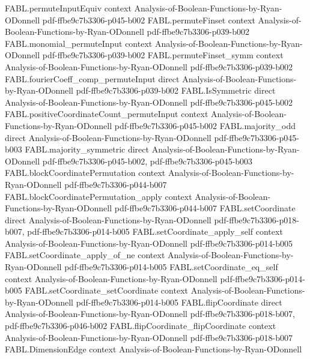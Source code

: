 \begin{theorem}
\proofstep
  {FABL.permuteInputEquiv}
  {context}
  {Analysis-of-Boolean-Functions-by-Ryan-ODonnell}
  {pdf-ffbe9c7b3306-p045-b002}
\proofstep
  {FABL.permuteFinset}
  {context}
  {Analysis-of-Boolean-Functions-by-Ryan-ODonnell}
  {pdf-ffbe9c7b3306-p039-b002}
\proofstep
  {FABL.monomial_permuteInput}
  {context}
  {Analysis-of-Boolean-Functions-by-Ryan-ODonnell}
  {pdf-ffbe9c7b3306-p039-b002}
\proofstep
  {FABL.permuteFinset_symm}
  {context}
  {Analysis-of-Boolean-Functions-by-Ryan-ODonnell}
  {pdf-ffbe9c7b3306-p039-b002}
\proofstep
  {FABL.fourierCoeff_comp_permuteInput}
  {direct}
  {Analysis-of-Boolean-Functions-by-Ryan-ODonnell}
  {pdf-ffbe9c7b3306-p039-b002}
\proofstep
  {FABL.IsSymmetric}
  {direct}
  {Analysis-of-Boolean-Functions-by-Ryan-ODonnell}
  {pdf-ffbe9c7b3306-p045-b002}
\proofstep
  {FABL.positiveCoordinateCount_permuteInput}
  {context}
  {Analysis-of-Boolean-Functions-by-Ryan-ODonnell}
  {pdf-ffbe9c7b3306-p045-b002}
\proofstep
  {FABL.majority_odd}
  {direct}
  {Analysis-of-Boolean-Functions-by-Ryan-ODonnell}
  {pdf-ffbe9c7b3306-p045-b003}
\proofstep
  {FABL.majority_symmetric}
  {direct}
  {Analysis-of-Boolean-Functions-by-Ryan-ODonnell}
  {pdf-ffbe9c7b3306-p045-b002,
    pdf-ffbe9c7b3306-p045-b003}
\proofstep
  {FABL.blockCoordinatePermutation}
  {context}
  {Analysis-of-Boolean-Functions-by-Ryan-ODonnell}
  {pdf-ffbe9c7b3306-p044-b007}
\proofstep
  {FABL.blockCoordinatePermutation_apply}
  {context}
  {Analysis-of-Boolean-Functions-by-Ryan-ODonnell}
  {pdf-ffbe9c7b3306-p044-b007}
\proofstep
  {FABL.setCoordinate}
  {direct}
  {Analysis-of-Boolean-Functions-by-Ryan-ODonnell}
  {pdf-ffbe9c7b3306-p018-b007,
    pdf-ffbe9c7b3306-p014-b005}
\proofstep
  {FABL.setCoordinate_apply_self}
  {context}
  {Analysis-of-Boolean-Functions-by-Ryan-ODonnell}
  {pdf-ffbe9c7b3306-p014-b005}
\proofstep
  {FABL.setCoordinate_apply_of_ne}
  {context}
  {Analysis-of-Boolean-Functions-by-Ryan-ODonnell}
  {pdf-ffbe9c7b3306-p014-b005}
\proofstep
  {FABL.setCoordinate_eq_self}
  {context}
  {Analysis-of-Boolean-Functions-by-Ryan-ODonnell}
  {pdf-ffbe9c7b3306-p014-b005}
\proofstep
  {FABL.setCoordinate_setCoordinate}
  {context}
  {Analysis-of-Boolean-Functions-by-Ryan-ODonnell}
  {pdf-ffbe9c7b3306-p014-b005}
\proofstep
  {FABL.flipCoordinate}
  {direct}
  {Analysis-of-Boolean-Functions-by-Ryan-ODonnell}
  {pdf-ffbe9c7b3306-p018-b007,
    pdf-ffbe9c7b3306-p046-b002}
\proofstep
  {FABL.flipCoordinate_flipCoordinate}
  {context}
  {Analysis-of-Boolean-Functions-by-Ryan-ODonnell}
  {pdf-ffbe9c7b3306-p018-b007}
\proofstep
  {FABL.DimensionEdge}
  {context}
  {Analysis-of-Boolean-Functions-by-Ryan-ODonnell}

\end{theorem}

